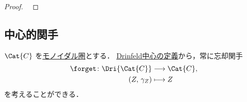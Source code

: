 \documentclass[TQFT_main]{subfiles}
\begin{document}
\begin{proof}
    ~\cite[COROLLARY 7.16.2.]{etingof2015tensor}
\end{proof}



\subsection{中心的関手}

$\Cat{C}$ を\hyperref[redef:monoidal-category]{モノイダル圏}とする．
\hyperref[def:Drinfeld-center]{Drinfeld中心の定義}から，常に忘却関手
\begin{align}
    \forget \colon \Dri{\Cat{C}} &\lto \Cat{C}, \\
    (Z,\, \gamma_Z) &\lmto Z
\end{align}
を考えることができる．
\end{document}
